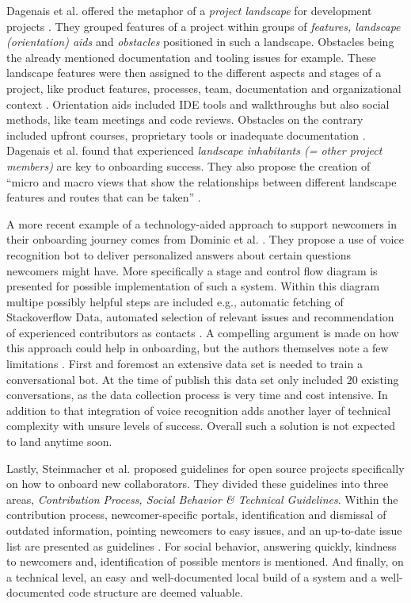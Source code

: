 Dagenais et al. offered the metaphor of a \textit{project landscape} for development projects \cite{dagenais2010moving}. They grouped features of a project within groups of \textit{features, landscape (orientation) aids} and \textit{obstacles} positioned in such a landscape. Obstacles being the already mentioned documentation and tooling issues for example. These landscape features were then assigned to the different aspects and stages of a project, like product features, processes, team, documentation and organizational context \cite[p. 278]{dagenais2010moving}. Orientation aids included IDE tools and walkthroughs but also social methods, like team meetings and code reviews. Obstacles on the contrary included upfront courses, proprietary tools or inadequate documentation \cite[p. 278]{dagenais2010moving}. Dagenais et al. found that experienced \textit{landscape inhabitants (= other project members)} are key to onboarding success. They also propose the creation of \enquote{micro and macro views that show the relationships between different landscape features and routes that can be taken} \cite[p. 284]{dagenais2010moving}.

A more recent example of a technology-aided approach to support newcomers in their onboarding journey comes from Dominic et al. \cite{dominic2020onboarding}. They propose a use of voice recognition bot to deliver personalized answers about certain questions newcomers might have. More specifically a stage and control flow diagram is presented for possible implementation of such a system. Within this diagram multipe possibly helpful steps are included e.g., automatic fetching of Stackoverflow Data, automated selection of relevant issues and recommendation of experienced contributors as contacts \cite[p. 48]{dominic2020onboarding}. A compelling argument is made on how this approach could help in onboarding, but the authors themselves note a few limitations \cite[p. 49]{dominic2020onboarding}. First and foremost an extensive data set is needed to train a conversational bot. At the time of publish this data set only included 20 existing conversations, as the data collection process is very time and cost intensive. In addition to that integration of voice recognition adds another layer of technical complexity with unsure levels of success. Overall such a solution is not expected to land anytime soon.

Lastly, Steinmacher et al. proposed guidelines for open source projects specifically on how to onboard new collaborators. They divided these guidelines into three areas, \textit{Contribution Process, Social Behavior \& Technical Guidelines}. Within the contribution process, newcomer-specific portals, identification and dismissal of outdated information, pointing newcomers to easy issues, and an up-to-date issue list are presented as guidelines \cite[p. 7-8]{steinmacher2018let}. For social behavior, answering quickly, kindness to newcomers and, identification of possible mentors is mentioned. And finally, on a technical level, an easy and well-documented local build of a system and a well-documented code structure are deemed valuable.

